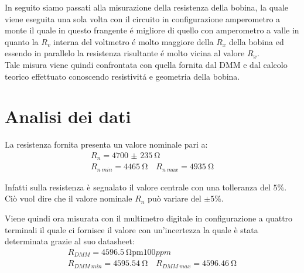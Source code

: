 \documentclass{article}
\begin{document}
In seguito siamo passati alla misurazione della resistenza della bobina, la quale viene eseguita una sola volta con il circuito in configurazione amperometro a monte il quale in questo frangente \'e migliore di quello con amperometro a valle in quanto la $R_v$ interna del voltmetro \'e molto maggiore della $R_x$ della bobina ed essendo in parallelo la resistenza risultante \'e molto vicina al valore $R_x$.\\
Tale misura viene quindi confrontata con quella fornita dal DMM e dal calcolo teorico effettuato conoscendo resistivit\'a e geometria della bobina.

\newpage


\section{Analisi dei dati}

La resistenza fornita presenta un valore nominale pari a:
\begin{gather}
    R_n = \SI{4700(235)}{\ohm} \\
    \nonumber
    R_{n\ min} = \SI{4465}{\ohm} \quad
    R_{n\ max} = \SI{4935}{\ohm}
\end{gather}

Infatti sulla resistenza è segnalato il valore centrale con una tolleranza del $5\%$. Ciò vuol dire che il valore nominale $R_n$ può variare del $\pm 5\%$.

Viene quindi ora misurata con il multimetro digitale in configurazione a quattro terminali il quale ci fornisce il valore con un'incertezza la quale è stata determinata grazie al suo datasheet:
\begin{gather}
    R_{DMM} = \SI{4596.5}{\ohm \pm 100 ppm} \\
    \nonumber
    R_{DMM\ min} = \SI{4595.54}{\ohm} \quad
    R_{DMM\ max} = \SI{4596.46}{\ohm}
\end{gather}
\end{document}
